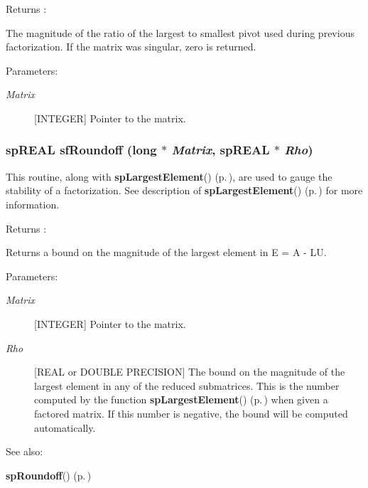 \begin{Desc}
\item[Returns :]\par
[REAL or DOUBLE PRECISION] The magnitude of the ratio of the largest to smallest pivot used during previous factorization. If the matrix was singular, zero is returned.\end{Desc}
\begin{Desc}
\item[Parameters: ]\par
\begin{description}
\item[{\em 
Matrix}][INTEGER] Pointer to the matrix. \end{description}
\end{Desc}
\subsubsection{\setlength{\rightskip}{0pt plus 5cm}sp\-REAL sf\-Roundoff (long $\ast$ {\em Matrix}, sp\-REAL $\ast$ {\em Rho})}\label{spFortran_8c_a88}


This routine, along with {\bf sp\-Largest\-Element}() {\rm (p.\,\pageref{spUtils_8c_a22})}, are used to gauge the stability of a factorization. See description of {\bf sp\-Largest\-Element}() {\rm (p.\,\pageref{spUtils_8c_a22})} for more information.

\begin{Desc}
\item[Returns :]\par
[REAL or DOUBLE PRECISION] Returns a bound on the magnitude of the largest element in E = A - LU.\end{Desc}
\begin{Desc}
\item[Parameters: ]\par
\begin{description}
\item[{\em 
Matrix}][INTEGER] Pointer to the matrix. \item[{\em 
Rho}][REAL or DOUBLE PRECISION] The bound on the magnitude of the largest element in any of the reduced submatrices. This is the number computed by the function {\bf sp\-Largest\-Element}() {\rm (p.\,\pageref{spUtils_8c_a22})} when given a factored matrix. If this number is negative, the bound will be computed automatically. \end{description}
\end{Desc}
\begin{Desc}
\item[See also: ]\par
{\bf sp\-Roundoff}() {\rm (p.\,\pageref{spUtils_8c_a23})} \end{Desc}
